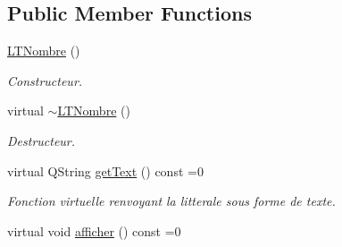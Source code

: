 \subsection*{Public Member Functions}
\begin{DoxyCompactItemize}
\item 
\hyperlink{class_l_t_nombre_ae1651d09e64312a910569e0bd6cc4408}{L\+T\+Nombre} ()\hypertarget{class_l_t_nombre_ae1651d09e64312a910569e0bd6cc4408}{}\label{class_l_t_nombre_ae1651d09e64312a910569e0bd6cc4408}

\begin{DoxyCompactList}\small\item\em Constructeur. \end{DoxyCompactList}\item 
virtual \hyperlink{class_l_t_nombre_ad12b52a30fda647436512754199ab135}{$\sim$\+L\+T\+Nombre} ()\hypertarget{class_l_t_nombre_ad12b52a30fda647436512754199ab135}{}\label{class_l_t_nombre_ad12b52a30fda647436512754199ab135}

\begin{DoxyCompactList}\small\item\em Destructeur. \end{DoxyCompactList}\item 
virtual Q\+String \hyperlink{class_l_t_nombre_a39fe941ec69bf013bc3be8b3e575c3d0}{get\+Text} () const  =0
\begin{DoxyCompactList}\small\item\em Fonction virtuelle renvoyant la litterale sous forme de texte. \end{DoxyCompactList}\item 
virtual void \hyperlink{class_l_t_nombre_aa06e186ee3ded2189e1a98a68d913775}{afficher} () const  =0\hypertarget{class_l_t_nombre_aa06e186ee3ded2189e1a98a68d913775}{}\label{class_l_t_nombre_aa06e186ee3ded2189e1a98a68d913775}


\end{DoxyCompactItemize}
